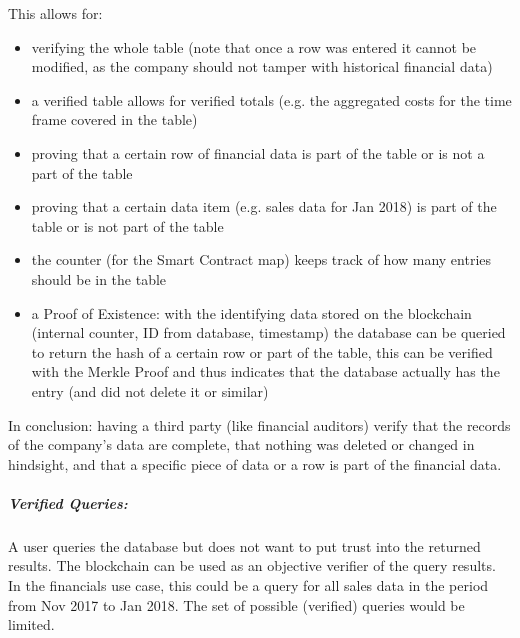 This allows for:
\begin{itemize}
\item verifying the whole table (note that once a row was entered it cannot be modified, as the company should not tamper with historical financial data)
\item a verified table allows for verified totals (e.g. the aggregated costs for the time frame covered in the table)
\item proving that a certain row of financial data is part of the table or is not a part of the table
\item proving that a certain data item (e.g. sales data for Jan 2018) is part of the table or is not part of the table
\item the counter (for the Smart Contract map) keeps track of how many entries should be in the table
\item a Proof of Existence: with the identifying data stored on the blockchain (internal counter, ID from database, timestamp) the database can be queried to return the hash of a certain row or part of the table, this can be verified with the Merkle Proof and thus indicates that the database actually has the entry (and did not delete it or similar)
\end{itemize}
In conclusion: having a third party (like financial auditors) verify that the records of the company’s data are complete, that nothing was deleted or changed in hindsight, and that a specific piece of data or a row is part of the financial data.

\subparagraph{Verified Queries:}
A user queries the database but does not want to put trust into the returned results. The blockchain can be used as an objective verifier of the query results.
In the financials use case, this could be a query for all sales data in the period from Nov 2017 to Jan 2018.
The set of possible (verified) queries would be limited.

